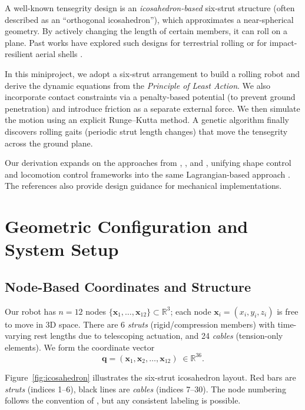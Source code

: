 \documentclass[12pt,letterpaper]{article}
\newcommand{\R}{\mathbb{R}}
\newcommand{\q}{\bm{q}}
\newcommand{\x}{\bm{x}}
\begin{document}
A well-known tensegrity design is an \emph{icosahedron-based} six-strut structure (often described as an ``orthogonal icosahedron''), which approximates a near-spherical geometry. By actively changing the length of certain members, it can roll on a plane. Past works have explored such designs for terrestrial rolling or for impact-resilient aerial shells \cite{ZhengCaiWang2020Rolling}.

In this miniproject, we adopt a six-strut arrangement to build a rolling robot and derive the dynamic equations from the \emph{Principle of Least Action}. We also incorporate contact constraints via a penalty-based potential (to prevent ground penetration) and introduce friction as a separate external force. We then simulate the motion using an explicit Runge--Kutta method. A genetic algorithm finally discovers rolling gaits (periodic strut length changes) that move the tensegrity across the ground plane.

Our derivation expands on the approaches from \cite{SkeltonOliveira2014}, \cite{Cai2020}, and \cite{ZhaWuDimickMueller2024}, unifying shape control and locomotion control frameworks into the same Lagrangian-based approach \cite{Cai2020}. The references \cite{ZhaWuKroegerPerezMueller2020IROS,HiraiImuta2014ICCM,ZhengCaiWang2020Rolling,ZhaWuDimickMueller2024} also provide design guidance for mechanical implementations.

\section{Geometric Configuration and System Setup}
\subsection{Node-Based Coordinates and Structure}
Our robot has $n=12$ nodes $\{\x_1, \dots, \x_{12}\}\subset \R^3$; each node $\x_i=(x_i,y_i,z_i)$ is free to move in 3D space. There are 6 \emph{struts} (rigid/compression members) with time-varying rest lengths due to telescoping actuation, and 24 \emph{cables} (tension-only elements). We form the coordinate vector
\[
 \q = (\x_1,\x_2,\dots,\x_{12}) \;\in \R^{36}.
\]

Figure~\ref{fig:icosahedron} illustrates the six-strut icosahedron layout. Red bars are \emph{struts} (indices 1–6), black lines are \emph{cables} (indices 7–30). The node numbering follows the convention of \cite{Cai2020}, but any consistent labeling is possible.
\end{document}
